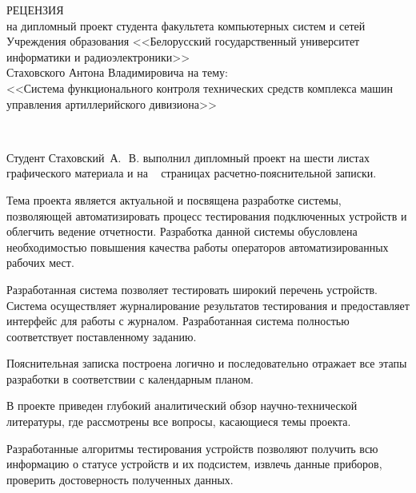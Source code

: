 
\thispagestyle{empty}

\begin{singlespace}

{\small
  \begin{center}
    \begin{minipage}{1.0\textwidth}
      \begin{center}
        {\normalsize РЕЦЕНЗИЯ}\\[0.2cm]
        на дипломный проект студента факультета компьютерных систем и сетей Учреждения образования <<Белорусский государственный университет информатики и радиоэлектроники>>\\
        Стаховского Антона Владимировича на тему: \\
	      <<Система функционального контроля технических средств комплекса машин управления артиллерийского
	      дивизиона>>
      \end{center}
    \end{minipage}\\
  \end{center}

  Студент Стаховский~А.~\,В. выполнил дипломный проект на шести листах графического материала и на
	~\pageref*{LastPage} страницах расчетно-пояснительной записки.

  Тема проекта является актуальной и посвящена разработке системы, позволяющей автоматизировать процесс тестирования
	подключенных устройств и облегчить ведение отчетности.
  Разработка данной системы обусловлена необходимостью повышения качества работы операторов автоматизированных рабочих
	мест.

  Разработанная система позволяет тестировать широкий перечень устройств. Система
	осуществляет журналирование результатов тестирования и предоставляет интерфейс для работы с журналом.
	Разработанная система полностью соответствует поставленному заданию.

  Пояснительная записка построена логично и последовательно отражает все этапы разработки в соответствии с календарным планом.

  В проекте приведен глубокий аналитический обзор научно-технической литературы, где рассмотрены все
	вопросы, касающиеся темы проекта.

  Разработанные алгоритмы тестирования устройств позволяют получить всю информацию о статусе устройств и их подсистем,
	извлечь данные приборов, проверить достоверность полученных данных.

}
\end{singlespace}
